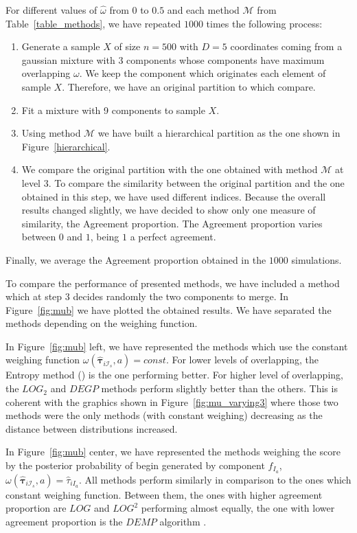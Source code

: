 \documentclass[10pt, a4paper]{article}
\newcommand{\m}[1]{\boldsymbol{#1}}
\begin{document}
For different values of $\hat{\omega}$ from $0$ to $0.5$ and each method $\mathcal{M}$ from Table~\ref{table_methods},  we  have repeated $1000$ times the following process:
\begin{enumerate}
\item Generate a sample $X$ of size $n=500$ with $D=5$ coordinates coming from a gaussian mixture with $3$ components whose components have maximum overlapping $\omega$. We keep the component which originates each element of sample $X$. Therefore, we have an original partition to which compare.
\item Fit a mixture with 9 components to sample $X$.
\item Using method $\mathcal{M}$ we have built a hierarchical partition as the one shown in Figure~\ref{hierarchical}.
\item We compare the original partition with the one obtained with method $\mathcal{M}$ at level $3$. To compare the similarity between the original partition and the one obtained in this step, we have used different indices. Because the overall results changed slightly, we have decided to show only one measure of similarity, the Agreement proportion. The Agreement proportion varies between $0$ and $1$, being $1$ a perfect agreement.
\end{enumerate}

Finally, we average the Agreement proportion obtained in the $1000$ simulations.

To compare the performance of presented methods, we have included a method which at step $3$ decides randomly the two components to merge. In Figure~\ref{fig:mub} we have plotted the obtained results. We have separated the methods depending on the weighing function.

In Figure~\ref{fig:mub} left, we have represented the methods which use the constant weighing function $\omega(\hat{\m \tau}_{i \mathcal{I}_s}, a) = const$. For lower levels of overlapping, the Entropy method (\cite{baudry2010combining}) is the one performing better. For higher level of overlapping, the $LOG_2$ and $DEGP$ methods perform slightly better than the others. This is coherent with the graphics shown in Figure~\ref{fig:mu_varying3} where those two methods were the only methods (with constant weighing) decreasing as the distance between distributions increased.

In Figure~\ref{fig:mub} center, we have represented the methods weighing the score by the posterior probability of begin generated by component $\hat{f}_{I_a}$, $\omega(\hat{\m \tau}_{i \mathcal{I}_s}, a) =  \hat{\tau}_{iI_a}$. All methods perform similarly in comparison to the ones which constant weighing function. Between them, the ones with higher agreement proportion are $LOG$ and $LOG^2$ performing almost equally, the one with lower agreement proportion is the $DEMP$ algorithm \citep{hennig2010methods}.
\end{document}
